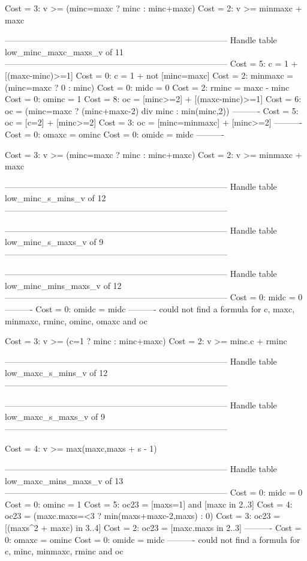 Cost =  3:  v >= (minc=maxc ? minc : minc+maxc)
Cost =  2:  v >= minmaxc + maxc

--------------------------------------------------------------------------------
Handle table low_minc_maxc_maxs_v of 11
--------------------------------------------------------------------------------
Cost =  5:  c       = 1 + [(maxc-minc)>=1]
Cost =  0:  c       = 1 + not [minc=maxc]
Cost =  2:  minmaxc = (minc=maxc ? 0 : minc)
Cost =  0:  midc    = 0
Cost =  2:  rminc   = maxc - minc
Cost =  0:  ominc   = 1
Cost =  8:  oc      = [minc>=2] + [(maxc-minc)>=1]
Cost =  6:  oc      = (minc=maxc ? (minc+maxc-2) div minc : min(minc,2))
----------
Cost =  5:  oc      = [c=2] + [minc>=2]
Cost =  3:  oc      = [minc=minmaxc] + [minc>=2]
----------
Cost =  0:  omaxc   = ominc
Cost =  0:  omidc   = midc
----------

Cost =  3:  v >= (minc=maxc ? minc : minc+maxc)
Cost =  2:  v >= minmaxc + maxc

--------------------------------------------------------------------------------
Handle table low_minc_s_mins_v of 12
--------------------------------------------------------------------------------


--------------------------------------------------------------------------------
Handle table low_minc_s_maxs_v of 9
--------------------------------------------------------------------------------


--------------------------------------------------------------------------------
Handle table low_minc_mins_maxs_v of 12
--------------------------------------------------------------------------------
Cost =  0:  midc    = 0
----------
Cost =  0:  omidc   = midc
----------
could not find a formula for c, maxc, minmaxc, rminc, ominc, omaxc and oc

Cost =  3:  v >= (c=1 ? minc : minc+maxc)
Cost =  2:  v >= minc.c + rminc

--------------------------------------------------------------------------------
Handle table low_maxc_s_mins_v of 12
--------------------------------------------------------------------------------


--------------------------------------------------------------------------------
Handle table low_maxc_s_maxs_v of 9
--------------------------------------------------------------------------------

Cost =  4:  v >= max(maxc,maxs + s - 1)

--------------------------------------------------------------------------------
Handle table low_maxc_mins_maxs_v of 13
--------------------------------------------------------------------------------
Cost =  0:  midc    = 0
Cost =  0:  ominc   = 1
Cost =  5:  oc23    = [maxs=1] and [maxc in 2..3]
Cost =  4:  oc23    = (maxc.maxs=<3 ? min(maxs+maxc-2,maxs) : 0)
Cost =  3:  oc23    = [(maxs^2 + maxc) in 3..4]
Cost =  2:  oc23    = [maxc.maxs in 2..3]
----------
Cost =  0:  omaxc   = ominc
Cost =  0:  omidc   = midc
----------
could not find a formula for c, minc, minmaxc, rminc and oc

